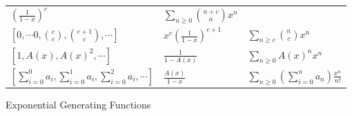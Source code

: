 \begin{longtable}[]{@{}lll@{}}
\begin{minipage}[t]{0.30\columnwidth}
\(\left( \frac 1 {1-x} \right)^c\)\strut
\end{minipage} & \begin{minipage}[t]{0.30\columnwidth}\raggedright
\(\displaystyle\sum_{n \geq 0}{n+c \choose n} x^n\)\strut
\end{minipage}\tabularnewline
\begin{minipage}[t]{0.30\columnwidth}\raggedright
\([0,\cdots 0, {c \choose c}, {c+1 \choose c}, \cdots]\)\strut
\end{minipage} & \begin{minipage}[t]{0.30\columnwidth}\raggedright
\(x^c \left(\frac{1}{1-x}\right)^{c+1}\)\strut
\end{minipage} & \begin{minipage}[t]{0.30\columnwidth}\raggedright
\(\displaystyle\sum_{n\geq c}{n \choose c}x^n\)\strut
\end{minipage}\tabularnewline
\begin{minipage}[t]{0.30\columnwidth}\raggedright
\([1, A(x), A(x)^2, \cdots ]\)\strut
\end{minipage} & \begin{minipage}[t]{0.30\columnwidth}\raggedright
\(\frac {1}{1-A(x)}\)\strut
\end{minipage} & \begin{minipage}[t]{0.30\columnwidth}\raggedright
\(\displaystyle\sum_{n\geq 0} A(x)^n {x^n}\)\strut
\end{minipage}\tabularnewline
\begin{minipage}[t]{0.30\columnwidth}\raggedright
\([\sum_{i=0}^0 a_i, \sum_{i=0}^1 a_i, \sum_{i=0}^2 a_i, \cdots ]\)\strut
\end{minipage} & \begin{minipage}[t]{0.30\columnwidth}\raggedright
\(\frac{A(x)}{1-x}\)\strut
\end{minipage} & \begin{minipage}[t]{0.30\columnwidth}\raggedright
\(\displaystyle\sum_{n\geq 0} \left(\sum_{i=0}^n a_n\right) \frac{x^n}{n!}\)\strut
\end{minipage}\tabularnewline
\bottomrule
\end{longtable}

Exponential Generating Functions


